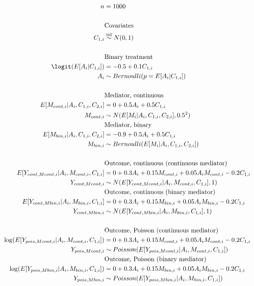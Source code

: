 \documentclass[10pt]{article}
\begin{document}
\begin{align*}
  n
  &= 1000\\
  \\
  &\text{Covariates}\\
  C_{1,i} &\overset{\text{iid}}{\sim} N(0,1)\\
  \\
  &\text{Binary treatment}\\
  \logit(E[A_{i} | C_{1,i}])
  &= -0.5 + 0.1 C_{1,i}\\
  A_{i} &\sim Bernoulli(p = E[A_{i} | C_{1,i}])\\
  \\
  &\text{Mediator, continuous}\\
  E[M_{cont,i} | A_{i}, C_{1,i}, C_{2,i}]
  &= 0 + 0.5 A_{i} + 0.5 C_{1,i}\\
  M_{cont,i} &\sim N(E[M_{i} | A_{i}, C_{1,i}, C_{2,i}], 0.5^{2})\\
  &\text{Mediator, binary}\\
  E[M_{bin,i} | A_{i}, C_{1,i}, C_{2,i}]
  &= -0.9 + 0.5 A_{i} + 0.5 C_{1,i}\\
  M_{bin,i} &\sim Bernoulli(E[M_{i} | A_{i}, C_{1,i}, C_{2,i}])\\
  \\
  &\text{Outcome, continuous (continuous mediator)}\\
  E[Y_{cont,Mcont,i} | A_{i}, M_{cont,i}, C_{1,i}]
  &= 0 + 0.3 A_{i} + 0.15 M_{cont,i} + 0.05 A_{i} M_{cont,i} -0.2 C_{1,i}\\
  Y_{cont,Mcont,i} &\sim N(E[Y_{cont,Mcont,i} | A_{i}, M_{cont,i}, C_{1,i}], 1)\\
  &\text{Outcome, continuous (binary mediator)}\\
  E[Y_{cont,Mbin,i} | A_{i}, M_{bin,i}, C_{1,i}]
  &= 0 + 0.3 A_{i} + 0.15 M_{bin,i} + 0.05 A_{i} M_{bin,i} -0.2 C_{1,i}\\
  Y_{cont,Mbin,i} &\sim N(E[Y_{cont,Mbin,i} | A_{i}, M_{bin,i}, C_{1,i}], 1)\\
  \\
  &\text{Outcome, Poisson (continuous mediator)}\\
  \log(E[Y_{pois,Mcont,i} | A_{i}, M_{cont,i}, C_{1,i}])
  &= 0 + 0.3 A_{i} + 0.15 M_{cont,i} + 0.05 A_{i} M_{cont,i} -0.2 C_{1,i}\\
  Y_{pois,Mcont,i} &\sim Poisson(E[Y_{pois,Mcont,i} | A_{i}, M_{cont,i}, C_{1,i}])\\
  &\text{Outcome, Poisson (binary mediator)}\\
  \log(E[Y_{pois,Mbin,i} | A_{i}, M_{bin,i}, C_{1,i}])
  &= 0 + 0.3 A_{i} + 0.15 M_{bin,i} + 0.05 A_{i} M_{bin,i} -0.2 C_{1,i}\\
  Y_{pois,Mbin,i} &\sim Poisson(E[Y_{pois,Mbin,i} | A_{i}, M_{bin,i}, C_{1,i}])\\
\end{align*}
\end{document}
